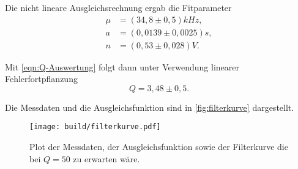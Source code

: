 Die nicht lineare Ausgleichsrechnung ergab die Fitparameter
\begin{align}
	\label{eqn:fit-ergebnisse}
	\mu &= (34,8 \pm 0,5) \si{kHz}, \\
	a &= (0,0139 \pm 0,0025) \si{s}, \\
	n &= (0,53 \pm 0,028) \si{V}.
\end{align}

Mit \autoref{eqn:Q-Auswertung} folgt dann unter Verwendung linearer Fehlerfortpflanzung
\begin{equation}
	Q = 3,48 \pm 0,5.
\end{equation}

Die Messdaten und die Ausgleichsfunktion sind in \autoref{fig:filterkurve} dargestellt.

\begin{figure}
	\texttt{[image: build/filterkurve.pdf]}
	\caption{Plot der Messdaten, der Ausgleichsfunktion sowie der Filterkurve die bei
	$Q=50$ zu erwarten wäre.}
	\label{fig:filterkurve}
\end{figure}

